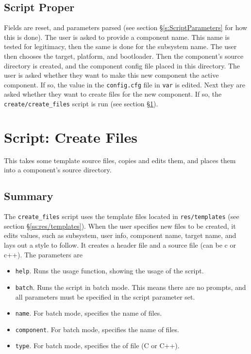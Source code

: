 \documentclass[a4paper, oneside, 11pt, titlepage, onecolumn, openright]{report}
\begin{document}
			
\subsection{Script Proper}
			\label{ss:crecompScriptProper}
			
			Fields are reset, and parameters parsed (see section \S\ref{s:ScriptParameters} for how this is done). \newline
			The user is asked to provide a component name. This name is tested for legitimacy, then the same is done for the subsystem name.\newline
			The user then chooses the target, platform, and bootloader. Then the component's source directory is created, and the component config file placed in this directory.\newline
			The user is asked whether they want to make this new component the active component. If so, the value in the \texttt{config.cfg} file in \texttt{var} is edited.\newline
			Next they are asked whether they want to create files for the new component. If so, the \texttt{create/create\_files} script is run (see section \S\ref{s:createFiles}).
			
\section{Script: Create Files}
			\label{s:createFiles}
			This takes some template source files, copies and edits them, and places them into a component's source directory.
	
\subsection{Summary}
			\label{ss:crefileSummary}
			The \texttt{create\_files} script uses the template files located in \texttt{res/templates} (see section \S\ref{ss:res/templates}). When the user specifies new files to be created, it edits values, such as subsystem, user info, component name, target name, and lays out a style to follow. It creates a header file and a source file (can be c or c++).
			The parameters are
			
\begin{itemize}
\item \texttt{help}. Runs the usage function, showing the usage of the script.
\item \texttt{batch}. Runs the script in batch mode. This means there are no prompts, and all parameters must be specified in the script parameter set.
\item \texttt{name}. For batch mode, specifies the name of files.
\item \texttt{component}. For batch mode, specifies the name of files.
\item \texttt{type}. For batch mode, specifies the of file (C or C++).
\end{itemize}
			
\end{document}
